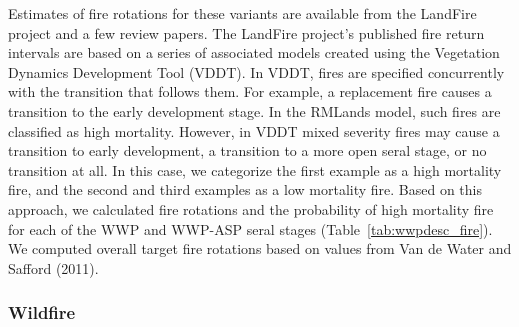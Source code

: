 Estimates of fire rotations for these variants are available from the LandFire project and a few review papers. The LandFire project’s published fire return intervals are based on a series of associated models created using the Vegetation Dynamics Development Tool (VDDT). In VDDT, fires are specified concurrently with the transition that follows them. For example, a replacement fire causes a transition to the early development stage. In the RMLands model, such fires are classified as high mortality. However, in VDDT mixed severity fires may cause a transition to early development, a transition to a more open seral stage, or no transition at all. In this case, we categorize the first example as a high mortality fire, and the second and third examples as a low mortality fire. Based on this approach, we calculated fire rotations and the probability of high mortality fire for each of the WWP and WWP-ASP seral stages (Table~\ref{tab:wwpdesc_fire}). We computed overall target fire rotations based on values from Van de Water and Safford (2011). 

\subsubsection*{Wildfire}




